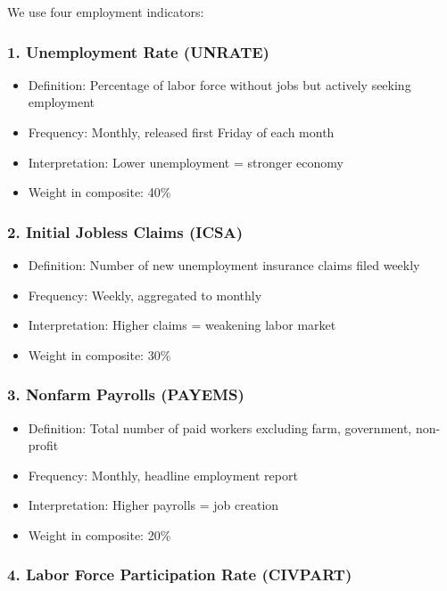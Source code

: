 \documentclass[12pt,a4paper]{article}
\begin{document}
We use four employment indicators:

\subsubsection{1. Unemployment Rate (UNRATE)}

\begin{itemize}
    \item Definition: Percentage of labor force without jobs but actively seeking employment
    \item Frequency: Monthly, released first Friday of each month
    \item Interpretation: Lower unemployment = stronger economy
    \item Weight in composite: 40\%
\end{itemize}

\subsubsection{2. Initial Jobless Claims (ICSA)}

\begin{itemize}
    \item Definition: Number of new unemployment insurance claims filed weekly
    \item Frequency: Weekly, aggregated to monthly
    \item Interpretation: Higher claims = weakening labor market
    \item Weight in composite: 30\%
\end{itemize}

\subsubsection{3. Nonfarm Payrolls (PAYEMS)}

\begin{itemize}
    \item Definition: Total number of paid workers excluding farm, government, non-profit
    \item Frequency: Monthly, headline employment report
    \item Interpretation: Higher payrolls = job creation
    \item Weight in composite: 20\%
\end{itemize}

\subsubsection{4. Labor Force Participation Rate (CIVPART)}
\end{document}
